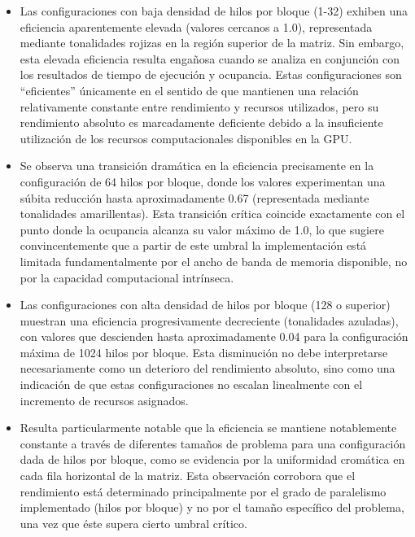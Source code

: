         \begin{itemize}
        
            \item Las configuraciones con baja densidad de hilos por bloque (1-32) exhiben una eficiencia aparentemente elevada (valores cercanos a 1.0), representada mediante tonalidades rojizas en la región superior de la matriz. Sin embargo, esta elevada eficiencia resulta engañosa cuando se analiza en conjunción con los resultados de tiempo de ejecución y ocupancia. Estas configuraciones son ``eficientes'' únicamente en el sentido de que mantienen una relación relativamente constante entre rendimiento y recursos utilizados, pero su rendimiento absoluto es marcadamente deficiente debido a la insuficiente utilización de los recursos computacionales disponibles en la GPU.
        
            \item Se observa una transición dramática en la eficiencia precisamente en la configuración de 64 hilos por bloque, donde los valores experimentan una súbita reducción hasta aproximadamente 0.67 (representada mediante tonalidades amarillentas). Esta transición crítica coincide exactamente con el punto donde la ocupancia alcanza su valor máximo de 1.0, lo que sugiere convincentemente que a partir de este umbral la implementación está limitada fundamentalmente por el ancho de banda de memoria disponible, no por la capacidad computacional intrínseca.
            
            \item Las configuraciones con alta densidad de hilos por bloque (128 o superior) muestran una eficiencia progresivamente decreciente (tonalidades azuladas), con valores que descienden hasta aproximadamente 0.04 para la configuración máxima de 1024 hilos por bloque. Esta disminución no debe interpretarse necesariamente como un deterioro del rendimiento absoluto, sino como una indicación de que estas configuraciones no escalan linealmente con el incremento de recursos asignados.
            
            \item Resulta particularmente notable que la eficiencia se mantiene notablemente constante a través de diferentes tamaños de problema para una configuración dada de hilos por bloque, como se evidencia por la uniformidad cromática en cada fila horizontal de la matriz. Esta observación corrobora que el rendimiento está determinado principalmente por el grado de paralelismo implementado (hilos por bloque) y no por el tamaño específico del problema, una vez que éste supera cierto umbral crítico.
            
        \end{itemize}
        
